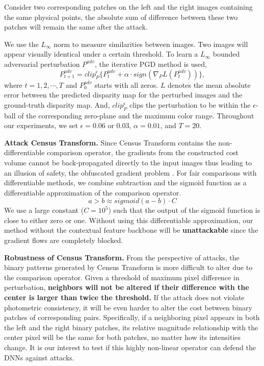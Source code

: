\documentclass[10pt,twocolumn,letterpaper]{article}
\begin{document}
Consider two corresponding patches on the left and the right images containing the same physical points, the absolute sum of difference between these two patches will remain the same after the attack. 


We use the $L_{\infty}$ norm to measure similarities between images. Two images will appear visually identical under a certain threshold. To learn a $L_{\infty}$ bounded adversarial perturbation $P^{adv}$, the iterative PGD method is used,
\begin{equation}
    P_{t+1}^{adv} = clip_{P}^{\epsilon}\{P_{t}^{adv}+\alpha\cdot {sign(\nabla_{P}L(P_{t}^{adv}))}\},
\end{equation}
where $t=1, 2, \cdots, T$ and $P^{adv}_0$ starts with all zeros. $L$ denotes the mean absolute error between the predicted disparity map for the perturbed images and the ground-truth disparity map. And, $clip_{P}^{\epsilon}$ clips the perturbation to be within the $\epsilon$-ball of the corresponding zero-plane and the maximum color range. Throughout our experiments, we set $\epsilon=0.06$ or $0.03$, $\alpha=0.01$, and $T=20$.



\textbf{Attack Census Transform.}
Since Census Transform contains the non-differentiable comparison operator, the gradients from the constructed cost volume cannot be back-propagated directly to the input images thus leading to an illusion of safety, \ie the obfuscated gradient problem \cite{obfuscated_gradients}. For fair comparisons with differentiable methods, we combine subtraction and the sigmoid function as a differentiable approximation of the comparison operator. 
\begin{equation}
    a>b \approx sigmoid(a-b)\cdot{C}
\end{equation}
We use a large constant (\ie $C=10^5$) such that the output of the sigmoid function is close to either zero or one. Without using this differentiable approximation, our method without the contextual feature backbone will be \textbf{unattackable} since the gradient flows are completely blocked.   

\textbf{Robustness of Census Transform.}
From the perspective of attacks, the binary patterns generated by Census Transform is more difficult to alter due to the comparison operator.  Given a threshold of maximum pixel difference in perturbation, \textbf{neighbors will not be altered if their difference with the center is larger than twice the threshold.} If the attack does not violate photometric consistency, it will be even harder to alter the cost between binary patches of corresponding pairs. Specifically, if a neighboring pixel appears in both the left and the right binary patches, its relative magnitude relationship with the center pixel will be the same for both patches, no matter how its intensities change. It is our interest to test if this highly non-linear operator can defend the DNNs against attacks.
\end{document}
